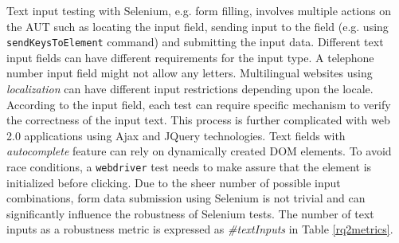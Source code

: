 Text input testing with Selenium, e.g. form filling, involves multiple actions on the AUT such as locating the input field, sending input to the field (e.g. using \texttt{sendKeysToElement} command) and submitting the input data. Different text input fields can have different requirements for the input type. A telephone number input field might not allow any letters. Multilingual websites using \textit{localization} can have different input restrictions depending upon the locale. According to the input field, each test can require specific mechanism to verify the correctness of the input text. This process is further complicated with web 2.0 applications using Ajax and JQuery technologies. Text fields with \textit{autocomplete} feature can rely on dynamically created DOM elements. To avoid race conditions, a \texttt{webdriver} test needs to make assure that the element is initialized before clicking. Due to the sheer number of possible input combinations, form data submission using Selenium is not trivial and can significantly influence the robustness of Selenium tests. The number of text inputs as a robustness metric is expressed as \textit{\#textInputs} in Table \ref{rq2metrics}. 
